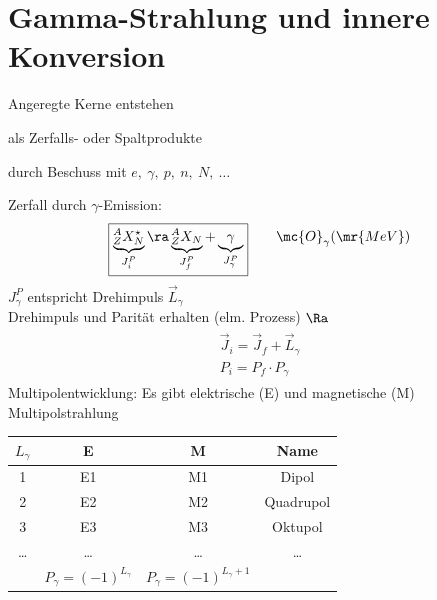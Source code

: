 \section{Gamma-Strahlung und innere Konversion}
Angeregte Kerne entstehen
\begin{compactitem}
\item als Zerfalls- oder Spaltprodukte
\item durch Beschuss mit $e,\ \gamma, \ p, \ n, \ N,\ \dots$
\end{compactitem}
Zerfall durch $\gamma$-Emission:
\begin{align}
\boxed{\underbrace{^A_Z X^\star_N}_{J_i^P} \ra \underbrace{^A_Z X_N}_{J_f^P} + \underbrace{\gamma}_{J_\gamma^P}} \qquad \mc{O}_\gamma(\mr{MeV})
\end{align}
$J_\gamma^P$ entspricht Drehimpuls $\vec{L}_\gamma$\\
Drehimpuls und Parität erhalten (elm. Prozess) $\Ra$
\begin{align}
\begin{split}
\vec{J}_i = \vec{J}_f + \vec{L}_\gamma \\
P_i = P_f \cdot P_\gamma
\end{split}
\end{align}
Multipolentwicklung: Es gibt elektrische (E) und magnetische (M) Multipolstrahlung
\begin{table}[!ht]
\centering
\begin{tabular}{|c|c|c|c|}
\hline
$L_\gamma$ & E & M & Name\\
\hline
1 & E1 & M1 & Dipol \\
2 & E2 & M2 & Quadrupol\\
3 & E3 & M3 & Oktupol\\
\dots & \dots & \dots & \dots\\
\hline
 & $P_\gamma = (-1)^{L_\gamma}$ & $P_\gamma = (-1)^{L_\gamma +1}$ & \\
 \hline
\end{tabular}
\end{table}


